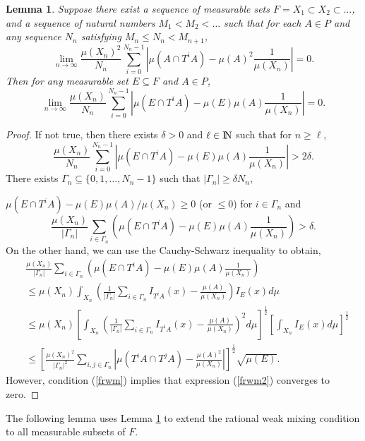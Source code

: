 \documentclass[12pt]{amsart}
\newtheorem{lemma}[theorem]{Lemma}
\begin{document}
\begin{lemma}
\label{approx1}
Suppose there exist a sequence of measurable sets 
$F=X_1 \subset X_2 \subset \ldots$, and a sequence of natural numbers 
$M_1 < M_2 < \ldots$ such that for each $A\in P$ 
and any sequence $N_n$ satisfying $M_n \leq N_n < M_{n+1}$, 
\begin{equation}
\lim_{n \to \infty} \frac{\mu (X_n)^{2}}{N_n} \sum_{i=0}^{N_n-1} 
| \mu (A\cap T^iA) - \mu (A)^2 \frac{1}{\mu (X_n)} | = 0 . \label{frwm}
\end{equation}
Then for any measurable set $E\subseteq F$ and $A\in P$, 
\[
\lim_{n \to \infty} \frac{\mu (X_n)}{N_n} \sum_{i=0}^{N_n-1} 
| \mu (E\cap T^iA) - \mu (E) \mu (A) \frac{1}{\mu (X_n)} | = 0 . 
\]
\end{lemma}
\begin{proof}
If not true, then there exists $\delta > 0$ and $\ell \in {\hbox{\rm\setbox1=\hbox{I}\copy1\kern-.45\wd1 N}}$ 
such that for $n \geq \ell$, 
\[
\frac{\mu (X_n)}{N_n} \sum_{i=0}^{N_n-1} 
| \mu(E\cap T^iA) - \mu(E)\mu(A)\frac{1}{\mu(X_n)} | > 2\delta . 
\]
There exists $\Gamma_n \subseteq \{0,1,\ldots ,N_n-1\}$ such that 
$| \Gamma_n | \geq \delta N_n$, 

\noindent 
$\mu (E\cap T^iA) - {\mu(E)\mu(A)}/{\mu(X_n)} \geq 0$ (or $\leq 0$) 
for $i\in \Gamma_n$ and 
\[
\frac{\mu (X_n)}{|\Gamma_n|} 
\sum_{i\in \Gamma_n} (\mu(E\cap T^iA) - \mu(E)\mu(A)\frac{1}{\mu(X_n)}) > \delta .
\]
On the other hand, we can use the Cauchy-Schwarz inequality to obtain,
\begin{align}
&\frac{\mu(X_n)}{|\Gamma_n|} \sum_{i\in \Gamma_n} 
(\mu(E\cap T^iA) - \mu(E)\mu(A)\frac{1}{\mu(X_n)}) \\ 
&\leq \mu(X_n) \int_{X_n} 
(\frac{1}{|\Gamma_n|}\sum_{i\in \Gamma_n} 
I_{T^iA}(x) - \frac{\mu(A)}{\mu(X_n)}) I_E(x) d\mu \\ 
&\leq \mu(X_n)[\int_{X_n} 
(\frac{1}{|\Gamma_n|}\sum_{i\in \Gamma_n} 
I_{T^iA}(x) - \frac{\mu(A)}{\mu(X_n)})^2 d\mu]^{\frac{1}{2}} 
[\int_{X_n} I_E(x)d\mu]^{\frac{1}{2}} \\ 
&\leq [ 
\frac{\mu(X_n)^2}{|\Gamma_n|^2} \sum_{i,j\in \Gamma_n} 
|\mu(T^iA\cap T^jA) - \frac{\mu(A)^2}{\mu(X_n)} | ]^{\frac{1}{2}} 
\sqrt{\mu(E)} . \label{frwm2}
\end{align}
However, condition (\ref{frwm}) implies that expression 
(\ref{frwm2}) converges to zero.
\end{proof}
The following lemma uses Lemma \ref{approx1} to extend 
the rational weak mixing condition to all measurable 
subsets of $F$. 
\end{document}
